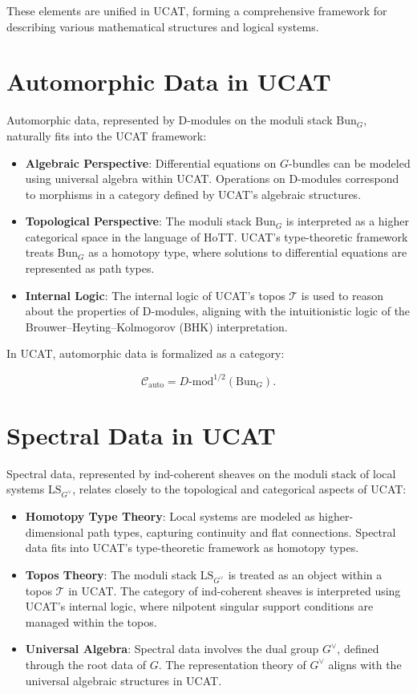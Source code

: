 \documentclass{article}
\begin{document}
These elements are unified in UCAT, forming a comprehensive framework for describing various mathematical structures and logical systems.

\section{Automorphic Data in UCAT}

Automorphic data, represented by D-modules on the moduli stack \( \text{Bun}_G \), naturally fits into the UCAT framework:

\begin{itemize}
    \item \textbf{Algebraic Perspective}: Differential equations on \( G \)-bundles can be modeled using universal algebra within UCAT. Operations on D-modules correspond to morphisms in a category defined by UCAT’s algebraic structures.
    \item \textbf{Topological Perspective}: The moduli stack \( \text{Bun}_G \) is interpreted as a higher categorical space in the language of HoTT. UCAT’s type-theoretic framework treats \( \text{Bun}_G \) as a homotopy type, where solutions to differential equations are represented as path types.
    \item \textbf{Internal Logic}: The internal logic of UCAT’s topos \( \mathcal{T} \) is used to reason about the properties of D-modules, aligning with the intuitionistic logic of the Brouwer–Heyting–Kolmogorov (BHK) interpretation.
\end{itemize}

In UCAT, automorphic data is formalized as a category:

\[
\mathcal{C}_{\text{auto}} = D\text{-mod}^{1/2}(\text{Bun}_G).
\]

\section{Spectral Data in UCAT}

Spectral data, represented by ind-coherent sheaves on the moduli stack of local systems \( \text{LS}_{G^{\vee}} \), relates closely to the topological and categorical aspects of UCAT:

\begin{itemize}
    \item \textbf{Homotopy Type Theory}: Local systems are modeled as higher-dimensional path types, capturing continuity and flat connections. Spectral data fits into UCAT’s type-theoretic framework as homotopy types.
    \item \textbf{Topos Theory}: The moduli stack \( \text{LS}_{G^{\vee}} \) is treated as an object within a topos \( \mathcal{T} \) in UCAT. The category of ind-coherent sheaves is interpreted using UCAT’s internal logic, where nilpotent singular support conditions are managed within the topos.
    \item \textbf{Universal Algebra}: Spectral data involves the dual group \( G^{\vee} \), defined through the root data of \( G \). The representation theory of \( G^{\vee} \) aligns with the universal algebraic structures in UCAT.
\end{itemize}
\end{document}
